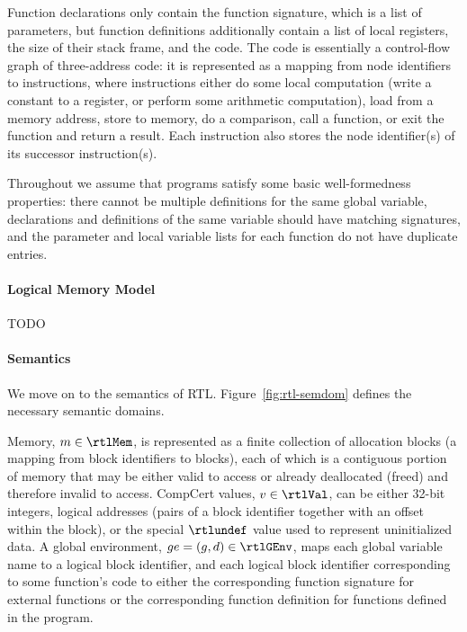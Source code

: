 Function declarations only contain the function signature, which is a list of parameters, but
function definitions additionally contain a list of local registers, the size of their stack frame,
and the code.  The code is essentially a control-flow graph of three-address code: it is represented
as a mapping from node identifiers to instructions, where instructions either
%
do some local computation (\eg write a constant to a register, or perform some arithmetic
computation),
%
load from a memory address, 
%
store to memory,
%
do a comparison,
%
call a function, 
%
or exit the function and return a result. 
%
Each instruction also stores the node identifier(s) of its successor instruction(s).

Throughout we assume that programs satisfy some basic well-formedness properties: there cannot be
multiple definitions for the same global variable, declarations and definitions of the same variable
should have matching signatures, and the parameter and local variable lists for each function do not
have duplicate entries.


\paragraph{Logical Memory Model}

TODO


\paragraph{Semantics}

% 

We move on to the semantics of RTL.  Figure~\ref{fig:rtl-semdom} defines the necessary semantic
domains.

Memory, $m\in\rtlMem$, is represented as a finite collection of allocation blocks (a mapping from
block identifiers to blocks), each of which is a contiguous portion of memory that may be either
valid to access or already deallocated (freed) and therefore invalid to access.  CompCert values,
$v\in\rtlVal$, can be either 32-bit integers, logical addresses (pairs of a block identifier
together with an offset within the block), or the special $\rtlundef$ value used to represent
uninitialized data.  A global environment, $ge=(g,d)\in\rtlGEnv$, maps each global variable name to
a logical block identifier, and each logical block identifier corresponding to some function's code
to either the corresponding function signature for external functions or the corresponding function
definition for functions defined in the program.

